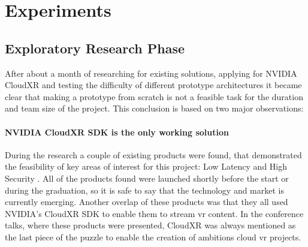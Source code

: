 \section{Experiments}

\subsection{Exploratory Research Phase}
After about a month of researching for existing solutions, applying for NVIDIA CloudXR \parencite{cloudxr} and testing the difficulty of different prototype architectures it became clear that making a prototype from scratch is not a feasible task for the duration and team size of the project. This conclusion is based on two major observations:

\paragraph{NVIDIA CloudXR SDK is the only working solution}
During the research a couple of existing products were found, that demonstrated the feasibility of key areas of interest for this project: Low Latency and High Security \parencite{gtc2020esi}. All of the products found were launched shortly before the start or during the graduation, so it is safe to say that the technology and market is currently emerging. Another overlap of these products was that they all used NVIDIA's CloudXR SDK to enable them to stream \acrshort{vr} content. In the conference talks, where these products were presented, CloudXR was always mentioned as the last piece of the puzzle to enable the creation of ambitions cloud \acrshort{vr} projects.


